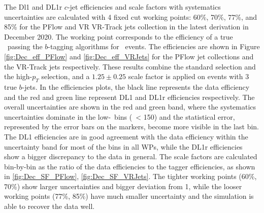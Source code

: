 \documentclass[letterpaper,12pt]{article}
\begin{document}
The Dl1 and DL1r $c$-jet efficiencies and scale factors with systematics 
uncertainties are calculated with 4 fixed cut working points: 
60\%, 70\%, 77\%, and 85\% for the PFlow and VR VR-Track jets collection in the latest derivation 
in December 2020. The working point corresponds to the efficiency of a true \bjet\ passing 
the $b$-tagging algorithms for \ttbar\ events. 
The efficiencies are shown in Figure \ref{fig:Dec_eff_PFlow} and \ref{fig:Dec_eff_VRJets} 
for the PFlow jet collections and the VR-Track jets respectively. 
These results combine the standard selection and the high-$p_T$ selection, 
and a $1.25 \pm 0.25$ scale factor is applied on events with 3 true $b$-jets. 
In the efficiencies plots, the black line represents the data efficiency and the red and 
green line represent DL1 and DL1r efficiencies respectively. The overall uncertainties are shown 
in the red and green band, where the systematics uncertainties dominate 
in the low-\pt\ bins (\pt\ < 150) and the statistical error, represented by the error bars on the 
markers, become more visible in the last bin. The DL1 efficiencies are in good agreement with the 
data efficiency within the uncertainty band for most of the bins in all WPs, while the DL1r efficiencies 
show a bigger discrepancy to the data in general. 
The scale factors are calculated bin-by-bin as the ratio of the data efficiencies to the tagger efficiencies,
as shown in \ref{fig:Dec_SF_PFlow}, \ref{fig:Dec_SF_VRJets}. 
The tighter working points (60\%, 70\%) show larger uncertainties and bigger deviation from 1, while
the looser working points (77\%, 85\%) have much smaller uncertainty and the simulation is able to 
recover the data well. 
\end{document}
